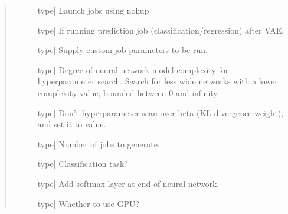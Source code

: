 \documentclass[letterpaper,10pt,english]{sphinxmanual}
\begin{document}
\begin{fulllineitems}
\begin{quote}
\begin{description}
\begin{description}
\item[{}] \leavevmode{[}type{]}
Launch jobs using nohup.

\item[{}] \leavevmode{[}type{]}
If running prediction job (classification/regression) after VAE.

\item[{}] \leavevmode{[}type{]}
Supply custom job parameters to be run.

\item[{}] \leavevmode{[}type{]}
Degree of neural network model complexity for hyperparameter search. Search for less wide networks with a lower complexity value, bounded between 0 and infinity.

\item[{}] \leavevmode{[}type{]}
Don’t hyperparameter scan over beta (KL divergence weight), and set it to value.

\item[{}] \leavevmode{[}type{]}
Number of jobs to generate.

\item[{}] \leavevmode{[}type{]}
Classification task?

\item[{}] \leavevmode{[}type{]}
Add softmax layer at end of neural network.

\item[{}] \leavevmode{[}type{]}
Whether to use GPU?

\end{description}

\end{description}\end{quote}

\end{fulllineitems}

\end{document}
